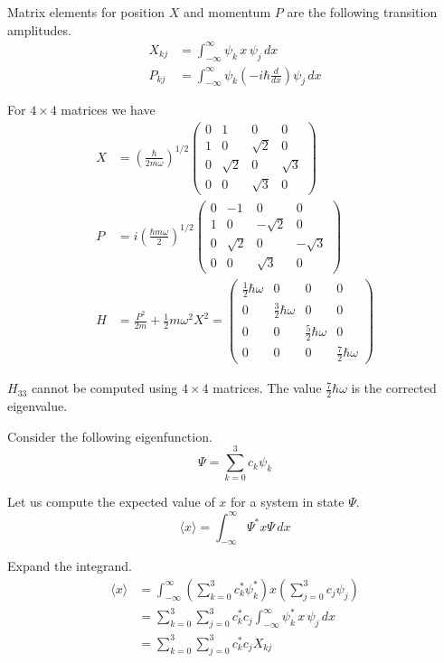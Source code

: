 \documentclass[12pt]{article}
\begin{document}
\noindent
Matrix elements for position $X$ and momentum $P$ are the following transition amplitudes.
\begin{align*}
X_{kj}&=\int_{-\infty}^\infty \psi_k\,x\,\psi_j\,dx
\\[1ex]
P_{kj}&=\int_{-\infty}^\infty \psi_k\left(-i\hbar\frac{d}{dx}\right)\psi_j\,dx
\end{align*}

\noindent
For $4\times4$ matrices we have
\begin{align*}
X&=\left(\frac{\hbar}{2m\omega}\right)^{1/2}
\begin{pmatrix}
0 & 1 & 0 & 0
\\
1 & 0 & \sqrt{2} & 0
\\
0 & \sqrt{2} & 0 & \sqrt{3}
\\
0 & 0 & \sqrt{3} & 0
\end{pmatrix}
\\[1ex]
P&=i\left(\frac{\hbar m\omega}{2}\right)^{1/2}
\begin{pmatrix}
0 & -1 & 0 & 0
\\
1 & 0 & -\sqrt{2} & 0
\\
0 & \sqrt{2} & 0 & -\sqrt{3}
\\
0 & 0 & \sqrt{3} & 0
\end{pmatrix}
\\[1ex]
H&=\frac{P^2}{2m}+\frac{1}{2}m\omega^2 X^2
=\begin{pmatrix}
\tfrac{1}{2}\hbar\omega & 0 & 0 & 0
\\
0 & \tfrac{3}{2}\hbar\omega & 0 & 0
\\
0 & 0 & \tfrac{5}{2}\hbar\omega & 0
\\
0 & 0 & 0 & \tfrac{7}{2}\hbar\omega
\end{pmatrix}
\end{align*}

\noindent
$H_{33}$ cannot be computed using $4\times4$ matrices.
The value $\tfrac{7}{2}\hbar\omega$ is the corrected eigenvalue.

\bigskip
\noindent
Consider the following eigenfunction.
\begin{equation*}
\Psi=\sum_{k=0}^3c_k\psi_k
\end{equation*}

\noindent
Let us compute the expected value of $x$ for a system in state $\Psi$.
\begin{equation*}
\langle x\rangle=\int_{-\infty}^\infty \Psi^* x\Psi\,dx
\end{equation*}

\noindent
Expand the integrand.
\begin{align*}
\langle x\rangle
&=\int_{-\infty}^\infty
\left(\sum_{k=0}^3c_k^*\psi_k^*\right) x \left(\sum_{j=0}^3c_j\psi_j\right)
\\
&=\sum_{k=0}^3\sum_{j=0}^3c_k^*c_j\int_{-\infty}^\infty\psi_k^*\,x\,\psi_j\,dx
\\
&=\sum_{k=0}^3\sum_{j=0}^3c_k^*c_j X_{kj}\tag{1}
\end{align*}
\end{document}
